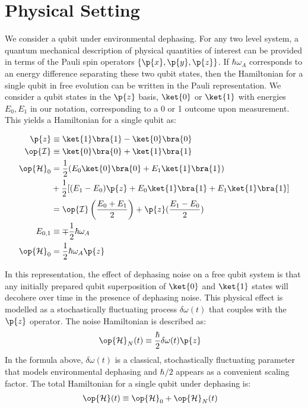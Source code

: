 

\section{Physical Setting \label{sec:app:setup_1}}


We consider a qubit under environmental dephasing.  For any two level system, a quantum mechanical description of physical quantities of interest can be provided in terms of the Pauli spin operators $\{ \p{x}, \p{y}, \p{z}\}$. If $\hbar \omega_A$ corresponds to an energy difference separating these two qubit states, then the Hamiltonian for a single qubit in free evolution can be written in the Pauli representation. We consider a qubit states in the $\p{z}$ basis, $\ket{0}$ or $\ket{1}$ with energies $E_0, E_1$ in our notation, corresponding to a 0 or 1 outcome upon measurement. This yields a Hamiltonian for a single qubit as:

\begin{align}
\p{z} &\equiv \ket{1}\bra{1} - \ket{0}\bra{0} \\
\op{\mathcal{I}} & \equiv \ket{0}\bra{0} + \ket{1}\bra{1} \\
\op{\mathcal{H}}_0 & = \frac{1}{2} (E_0\ket{0}\bra{0}+ E_1\ket{1}\bra{1}) \\
& + \frac{1}{2} [(E_1 - E_0)\p{z} + E_0 \ket{1}\bra{1} + E_1 \ket{1}\bra{1}]\\
& = \op{\mathcal{I}} \left( \frac{E_0 + E_1}{2} \right) + \p{z}(\frac{E_1 - E_0}{2}) \\
\quad E_{0,1} &\equiv \mp \frac{1}{2} \hbar \omega_A \\
\op{\mathcal{H}}_0 &= \frac{1}{2} \hbar \omega_A \p{z}
\end{align}

In this representation, the effect of dephasing noise on a free qubit system is that any initially prepared qubit superposition of $\ket{0}$ and $\ket{1}$ states will decohere over time in the presence of dephasing noise. This physical effect is modelled as a stochastically fluctuating process $\delta\omega(t)$ that couples with the $\p{z}$ operator. The noise Hamiltonian is described as:
\begin{align} 
\op{\mathcal{H}}_{N}(t) & \equiv \frac{\hbar}{2}\delta\omega(t)\p{z}
\end{align}
In the formula above, $\delta\omega(t)$ is a classical, stochastically fluctuating parameter that models environmental dephasing and $\hbar/2$ appears as a convenient scaling factor. The total Hamiltonian for a single qubit under dephasing is:
\begin{align} 
\op{\mathcal{H}}(t) &\equiv \op{\mathcal{H}}_0 + \op{\mathcal{H}}_{N}(t)
\end{align}

